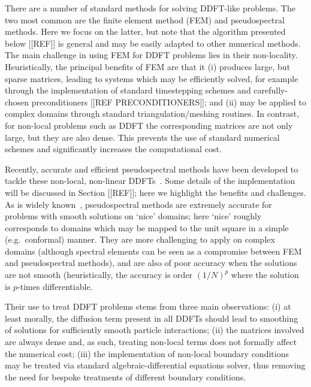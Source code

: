 There are a number of standard methods for solving DDFT-like problems.  The two most common are the finite element method (FEM)
and pseudospectral methods.  Here we focus on the latter, but note that the algorithm presented below [[REF]] is general and may
be easily adapted to other numerical methods.  The main challenge in using FEM for DDFT problems lies in their non-locality.
Heuristically, the principal benefits of FEM are that it (i) produces large, but sparse matrices, leading to systems which may be efficiently
solved, for example through the implementation of standard timestepping schemes and carefully-chosen preconditioners [[REF PRECONDITIONERS]]; and
(ii) may be applied to complex domains through standard triangulation/meshing routines.
In contrast, for non-local problems such as DDFT the corresponding matrices are not only large, but they are also dense.  This prevents
the use of standard numerical schemes and significantly increases the computational cost.

Recently, accurate and efficient pseudospectral methods have been developed to tackle these non-local, non-linear DDFTs~\cite{NGYSK17}.
Some details of the implementation will be discussed in Section [[REF]]; here we highlight the benefits and challenges.  As is widely 
known~\cite{T00,B01}, pseudospectral methods are extremely accurate for problems with smooth solutions on `nice' 
domains; here `nice' roughly corresponds to domains which may be mapped to the unit square in a simple (e.g.\ conformal) manner.
They are more challenging to apply on complex domains (although spectral elements can be seen as  a compromise between FEM
and pseudospectral methods), and are also of poor accuracy when the solutions are not smooth (heuristically, the accuracy is 
order $(1/N)^p$ where the solution is $p$-times differentiable.

Their use to treat DDFT problems stems from three main observations: (i) at least morally, the diffusion term present in
all DDFTs should lead to smoothing of solutions for sufficiently smooth particle interactions; (ii) the matrices involved are always
dense and, as such, treating non-local terms does not formally affect the numerical cost; (iii) the implementation of non-local 
boundary conditions may be treated via standard algebraic-differential equations solver, thus removing the need for bespoke
treatments of different boundary conditions.

